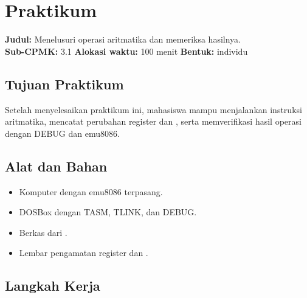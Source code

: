 \section{Praktikum}
\label{sec:praktikum-bab10}

\begin{praktikumbox}
\vspace{1.1em}
\textbf{Judul:} Menelusuri operasi aritmatika dan memeriksa
hasilnya.\\[0.3em]
\textbf{Sub-CPMK:} 3.1 \quad\textbullet\quad
\textbf{Alokasi waktu:} 100 menit \quad\textbullet\quad
\textbf{Bentuk:} individu
\end{praktikumbox}

\subsection{Tujuan Praktikum}

Setelah menyelesaikan praktikum ini, mahasiswa mampu menjalankan
instruksi aritmatika, mencatat perubahan register dan ,
serta memverifikasi hasil operasi dengan DEBUG dan emu8086.

\subsection{Alat dan Bahan}

\begin{itemize}
    \item Komputer dengan emu8086 terpasang.
    \item DOSBox dengan TASM, TLINK, dan DEBUG.
    \item Berkas  dari .
    \item Lembar pengamatan register dan .
\end{itemize}

\subsection{Langkah Kerja}

